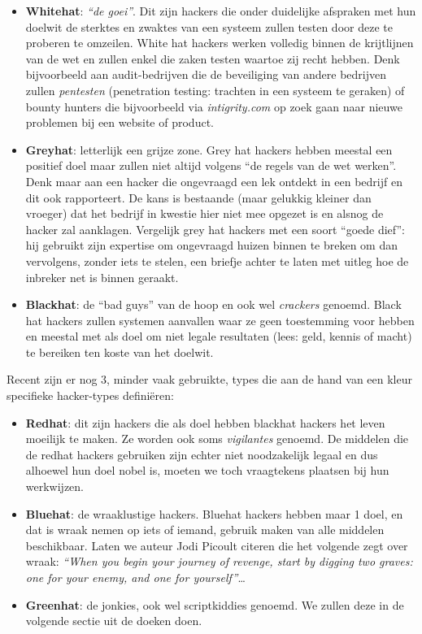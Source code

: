 \documentclass[
  10pt,
  dutch,
  paper=a4,
  ,captions=tableheading
]{scrbook}
\providecommand{\tightlist}{%
  \setlength{\itemsep}{0pt}\setlength{\parskip}{0pt}}
\begin{document}
\begin{itemize}
\tightlist
\item
  \textbf{Whitehat}: \emph{``de goei''}. Dit zijn hackers die onder
  duidelijke afspraken met hun doelwit de sterktes en zwaktes van een
  systeem zullen testen door deze te proberen te omzeilen. White hat
  hackers werken volledig binnen de krijtlijnen van de wet en zullen
  enkel die zaken testen waartoe zij recht hebben. Denk bijvoorbeeld aan
  audit-bedrijven die de beveiliging van andere bedrijven zullen
  \emph{pentesten} (penetration testing: trachten in een systeem te
  geraken) of bounty hunters die bijvoorbeeld via \emph{intigrity.com}
  op zoek gaan naar nieuwe problemen bij een website of product.
\item
  \textbf{Greyhat}: letterlijk een grijze zone. Grey hat hackers hebben
  meestal een positief doel maar zullen niet altijd volgens ``de regels
  van de wet werken''. Denk maar aan een hacker die ongevraagd een lek
  ontdekt in een bedrijf en dit ook rapporteert. De kans is bestaande
  (maar gelukkig kleiner dan vroeger) dat het bedrijf in kwestie hier
  niet mee opgezet is en alsnog de hacker zal aanklagen. Vergelijk grey
  hat hackers met een soort ``goede dief'': hij gebruikt zijn expertise
  om ongevraagd huizen binnen te breken om dan vervolgens, zonder iets
  te stelen, een briefje achter te laten met uitleg hoe de inbreker net
  is binnen geraakt.
\item
  \textbf{Blackhat}: de ``bad guys'' van de hoop en ook wel
  \emph{crackers} genoemd. Black hat hackers zullen systemen aanvallen
  waar ze geen toestemming voor hebben en meestal met als doel om niet
  legale resultaten (lees: geld, kennis of macht) te bereiken ten koste
  van het doelwit.
\end{itemize}

Recent zijn er nog 3, minder vaak gebruikte, types die aan de hand van
een kleur specifieke hacker-types definiëren:

\begin{itemize}
\tightlist
\item
  \textbf{Redhat}: dit zijn hackers die als doel hebben blackhat hackers
  het leven moeilijk te maken. Ze worden ook soms \emph{vigilantes}
  genoemd. De middelen die de redhat hackers gebruiken zijn echter niet
  noodzakelijk legaal en dus alhoewel hun doel nobel is, moeten we toch
  vraagtekens plaatsen bij hun werkwijzen.
\item
  \textbf{Bluehat}: de wraaklustige hackers. Bluehat hackers hebben maar
  1 doel, en dat is wraak nemen op iets of iemand, gebruik maken van
  alle middelen beschikbaar. Laten we auteur Jodi Picoult citeren die
  het volgende zegt over wraak: \emph{``When you begin your journey of
  revenge, start by digging two graves: one for your enemy, and one for
  yourself''}\ldots{}
\item
  \textbf{Greenhat}: de jonkies, ook wel scriptkiddies genoemd. We
  zullen deze in de volgende sectie uit de doeken doen.
\end{itemize}
\end{document}
